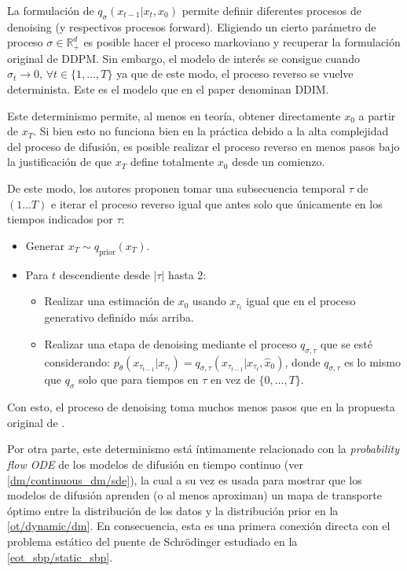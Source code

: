 La formulación de $q_\sigma(x_{t-1}|x_t,x_0)$ permite definir diferentes procesos de denoising (y respectivos procesos forward). Eligiendo un cierto parámetro de proceso $\sigma\in\mathbb{R}^d_+$ es posible hacer el proceso markoviano y recuperar la formulación original de DDPM. Sin embargo, el modelo de interés se consigue cuando $\sigma_t\to 0,\,\forall t\in\{1,\ldots, T\}$ ya que de este modo, el proceso reverso se vuelve determinista. Este es el modelo que en el paper denominan DDIM.

Este determinismo permite, al menos en teoría, obtener directamente $x_0$ a partir de $x_T$. Si bien esto no funciona bien en la práctica debido a la alta complejidad del proceso de difusión, es posible realizar el proceso reverso en menos pasos bajo la justificación de que $x_T$ define totalmente $x_0$ desde un comienzo.

De este modo, los autores proponen tomar una subsecuencia temporal $\tau$ de $(1\ldots T)$ e iterar el proceso reverso igual que antes solo que únicamente en los tiempos indicados por $\tau$:

\begin{itemize}
    \item Generar $x_T\sim q_{\text{prior}}(x_T)$.
    \item Para $t$ descendiente desde $|\tau|$ hasta 2:
          \begin{itemize}
              \item Realizar una estimación de $x_0$ usando $x_{\tau_t}$ igual que en el proceso generativo definido más arriba.
              \item Realizar una etapa de denoising mediante el proceso $q_{\sigma,\tau}$ que se esté considerando: $p_\theta(x_{\tau_{t-1}}|x_{\tau_t}) = q_{\sigma,\tau}(x_{\tau_{t-1}}|x_{\tau_t},\hat{x}_0)$, donde $q_{\sigma,\tau}$ es lo mismo que $q_\sigma$ solo que para tiempos en $\tau$ en vez de $\{0,\ldots,T\}$.
          \end{itemize}
\end{itemize}

Con esto, el proceso de denoising toma muchos menos pasos que en la propuesta original de \cite{ho2020denoising}.

Por otra parte, este determinismo está íntimamente relacionado con la \textit{probability flow ODE} de los modelos de difusión en tiempo continuo (ver \autoref{dm/continuous_dm/sde}), la cual a su vez es usada para mostrar que los modelos de difusión aprenden (o al menos aproximan) un mapa de transporte óptimo entre la distribución de los datos y la distribución prior en la \autoref{ot/dynamic/dm}. En consecuencia, esta es una primera conexión directa con el problema estático del puente de Schrödinger estudiado en la \autoref{eot_sbp/static_sbp}.

